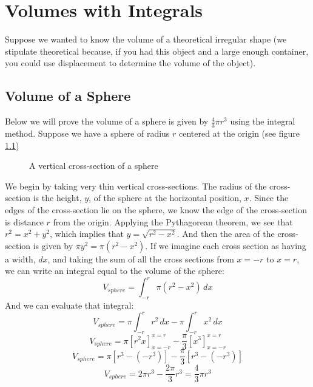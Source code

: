 \chapter{Volumes with Integrals}
Suppose we wanted to know the volume of a theoretical irregular shape (we 
stipulate theoretical because, if you had this object and a large enough 
container, you could use displacement to determine the volume of the object). 

\section{Volume of a Sphere}
Below we will prove the volume of a sphere is given by $\frac{4}{3}\pi r^3$ 
using the integral method. Suppose we have a sphere of radius $r$ centered at 
the origin (see figure \ref{fig:sphere})

\begin{figure}[htbp]
\centering
    \caption{A vertical cross-section of a sphere}
    \label{fig:sphere}
\end{figure}

We begin by taking very thin vertical cross-sections. The radius of the 
cross-section is the height, $y$, of the sphere at the horizontal position, 
$x$. Since the edges of the cross-section lie on the sphere, we know the edge 
of the cross-section is distance $r$ from the origin. Applying the Pythagorean 
theorem, we see that $r^2 = x^2 + y^2$, which implies that $y = \sqrt{r^2 - x^2
}$. And then the area of the cross-section is given by $\pi y^2 = \pi (r^2 - x^
2)$. If we imagine each cross section as having a width, $dx$, and taking the 
sum of all the cross sections from $x = -r$ to $x = r$, we can write an 
integral equal to the volume of the sphere:
$$V_{sphere} = \int_{-r}^{r} \pi (r^2 - x^2)\,dx$$
And we can evaluate that integral:
$$V_{sphere} = \pi \int_{-r}^{r} r^2\,dx - \pi \int_{-r}^{r} x^2\,dx$$
$$V_{sphere} = \pi \left[ r^2 x \right] _{x = -r}^{x = r} - \frac{\pi}{3} \left[
x^3 \right] _{x = -r}^{x = r} $$
$$V_{sphere} = \pi \left[ r^3 - (-r^3) \right] - \frac{\pi}{3} \left[r^3 - (-r^
3) \right]$$
$$V_{sphere} = 2 \pi r^3 - \frac{2\pi}{3} r^3 = \frac{4}{3}\pi r^3$$

